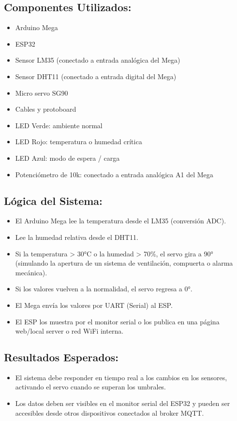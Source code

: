 \subsection{Componentes Utilizados:}
\begin{itemize}
    \item Arduino Mega
    \item ESP32
    \item Sensor LM35 (conectado a entrada analógica del Mega)
    \item Sensor DHT11 (conectado a entrada digital del Mega)
    \item Micro servo SG90
    \item Cables y protoboard
    \item LED Verde: ambiente normal
    \item LED Rojo: temperatura o humedad crítica
    \item LED Azul: modo de espera / carga
    \item Potenciómetro de 10k: conectado a entrada analógica A1 del Mega
\end{itemize}

\subsection{Lógica del Sistema:}
\begin{itemize}
    \item El Arduino Mega lee la temperatura desde el LM35 (conversión ADC).
    \item Lee la humedad relativa desde el DHT11.
    \item Si la temperatura > 30°C o la humedad > 70\%, el servo gira a 90° (simulando la apertura de un sistema de ventilación, compuerta o alarma mecánica).
    \item Si los valores vuelven a la normalidad, el servo regresa a 0°.
    \item El Mega envía los valores por UART (Serial) al ESP.
    \item El ESP los muestra por el monitor serial o los publica en una página web/local server o red WiFi interna.
\end{itemize}

\subsection{Resultados Esperados:}
\begin{itemize}
    \item El sistema debe responder en tiempo real a los cambios en los sensores, activando el servo cuando se superan los umbrales.
    \item Los datos deben ser visibles en el monitor serial del ESP32 y pueden ser accesibles desde otros dispositivos conectados al broker MQTT.
\end{itemize}


